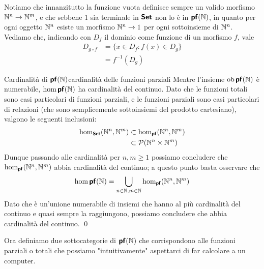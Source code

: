 \documentclass[openany]{book}
\begin{document}
Notiamo che innanzitutto la funzione vuota definisce sempre un valido morfismo $\mathbb{N}^n\to\mathbb{N}^m$, e che sebbene $1$ sia terminale in $\text{\sffamily\textbf{Set}}$ non lo è in $\text{\sffamily\textbf{pf}}(\mathbb{N})$, in quanto per ogni oggetto $\mathbb{N}^n$ esiste un morfismo $\mathbb{N}^n\to 1$ per ogni sottoinsieme di $\mathbb{N}^n$.\\
Vediamo che, indicando con $D_f$ il dominio come funzione di un morfismo $f$, vale 
\begin{align*}
    D_{g\circ f} & = \{ x \in D_f : f(x)\in D_g \} \\
    & = f^{-1}(D_g)
\end{align*}

\begin{proposition}{Cardinalità di $\text{\sffamily\textbf{pf}}(\mathbb{N})$}{cardinalità delle funzioni parziali}
    Mentre l'insieme $\operatorname{ob}\text{\sffamily\textbf{pf}}(\mathbb{N})$ è numerabile, $\hom\text{\sffamily\textbf{pf}}(\mathbb{N})$ ha cardinalità del continuo.
    \proof 
    Dato che le funzioni totali sono casi particolari di funzioni parziali, e le funzioni parziali sono casi particolari di relazioni (che sono semplicemente sottoinsiemi del prodotto cartesiano), valgono le seguenti inclusioni:
    \begin{align*}
        \hom_{\text{\sffamily\textbf{Set}}}(\mathbb{N}^n, \mathbb{N}^m) & \subset \hom_{\text{\sffamily\textbf{pf}}}(\mathbb{N}^n,\mathbb{N}^m) \\
        & \subset \mathcal{P}(\mathbb{N}^n\times \mathbb{N}^m)
    \end{align*}
    Dunque passando alle cardinalità per $n,m \ge 1$ possiamo concludere che $\hom_{\text{\sffamily\textbf{pf}}}(\mathbb{N}^n,\mathbb{N}^m)$ abbia cardinalità del continuo; a questo punto basta osservare che
    \[ \hom\text{\sffamily\textbf{pf}}(\mathbb{N}) = \bigcup_{n\in \mathbb{N}, m\in \mathbb{N}} \hom_{\text{\sffamily\textbf{pf}}}(\mathbb{N}^n,\mathbb{N}^m) \]
    Dato che è un'unione numerabile di insiemi che hanno al più cardinalità del continuo e quasi sempre la raggiungono, possiamo concludere che abbia cardinalità del continuo.
    \qed
\end{proposition}

Ora definiamo due sottocategorie di $\text{\sffamily\textbf{pf}}(\mathbb{N})$ che corrispondono alle funzioni parziali o totali che possiamo "intuitivamente" aspettarci di far calcolare a un computer.
\end{document}
